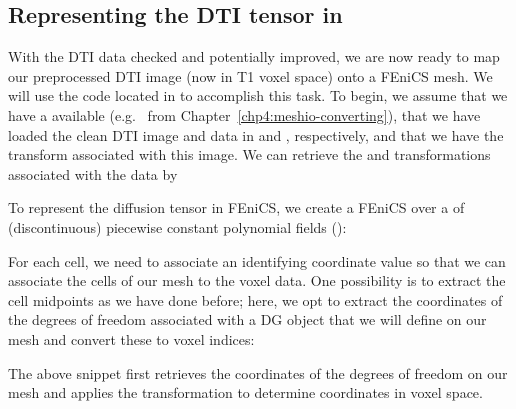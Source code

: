 \subsection{Representing the DTI tensor in \fenics{}}
\label{chp5:sec:loading-dti-tensor}

With the DTI data checked and potentially improved, we are now ready to map 
our preprocessed DTI image (now in T1 voxel space) onto a FEniCS mesh. We will 
use the code located in  to accomplish this 
task. To begin, we assume that we have a  available (e.g.~%
 from Chapter~\ref{chp4:meshio-converting}), that we have 
loaded the clean DTI image and data in  and , respectively, 
and that we have the  transform associated with this image. We can retrieve 
the  and  transformations associated with the data 
by 

To represent the diffusion tensor in FEniCS, we create a FEniCS
 over a  of (discontinuous)
piecewise constant polynomial fields (): 

For each cell, we need to associate an identifying coordinate value so
that we can associate the cells of our mesh to the voxel data. One
possibility is to extract the cell midpoints as we have done before;
here, we opt to extract the coordinates of the degrees of
freedom associated with a DG  object that we will 
define on our mesh and convert these to voxel indices:

\noindent The above snippet first retrieves the coordinates of the
 degrees of freedom on our mesh and applies
the  transformation to determine coordinates in voxel
space.

